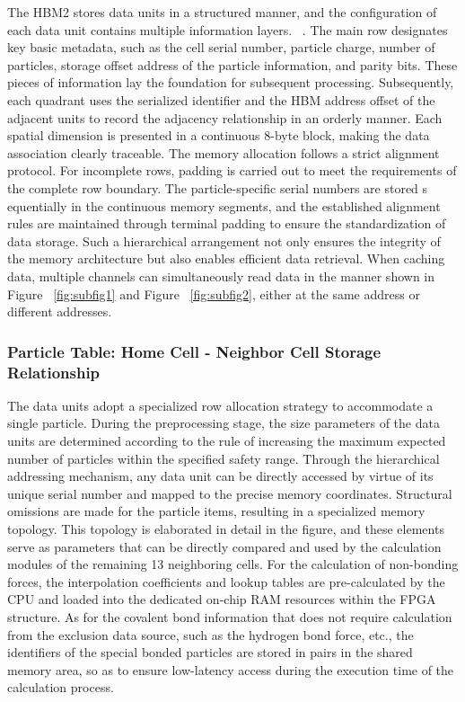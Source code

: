 \documentclass{article}
\begin{document}
The HBM2 stores data units in a structured manner, and the configuration of 
each data unit contains multiple information layers.~\cite{ref20,9556096} .
The main row designates key basic metadata, such as the cell serial number, 
particle charge, number of particles, storage offset address of the particle 
information, and parity bits. 
These pieces of information lay the foundation for subsequent processing. 
Subsequently, each quadrant uses the serialized identifier and the HBM address 
offset of the adjacent units to record the adjacency relationship in an orderly 
manner. 
Each spatial dimension is presented in a continuous 8-byte block, making the 
data association clearly traceable.
The memory allocation follows a strict alignment protocol. 
For incomplete rows, padding is carried out to meet the requirements of the 
complete row boundary. The particle-specific serial numbers are stored s
equentially in the continuous memory segments, and the established alignment 
rules are maintained through terminal padding to ensure the standardization of 
data storage. Such a hierarchical arrangement not only ensures the integrity of 
the memory architecture but also enables efficient data retrieval.
When caching data, multiple channels can simultaneously read data in the manner 
shown in Figure ~\ref{fig:subfig1} and Figure ~\ref{fig:subfig2}, either at 
the same address or different addresses.

\subsubsection{Particle Table: Home Cell - Neighbor Cell Storage Relationship}
\noindent
The data units adopt a specialized row allocation strategy to accommodate a 
single particle. 
During the preprocessing stage, the size parameters of the data units are 
determined according to the rule of increasing the maximum expected number of 
particles within the specified safety range. Through the hierarchical 
addressing mechanism, any data unit can be directly accessed by virtue of its 
unique serial number and mapped to the precise memory coordinates.
Structural omissions are made for the particle items, resulting in a 
specialized memory topology. This topology is elaborated in detail in the 
figure, and these elements serve as parameters that can be directly compared 
and used by the calculation modules of the remaining 13 neighboring cells.
For the calculation of non-bonding forces, the interpolation coefficients and 
lookup tables are pre-calculated by the CPU and loaded into the dedicated 
on-chip RAM resources within the FPGA structure. 
As for the covalent bond information that does not require calculation from 
the exclusion data source, such as the hydrogen bond force, etc., the 
identifiers of the special bonded particles are stored in pairs in the shared 
memory area, so as to ensure low-latency access during the execution time of 
the calculation process.
\end{document}
